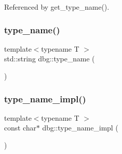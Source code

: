 Referenced by get\+\_\+type\+\_\+name().

\mbox{\label{namespacedbg_aab63fa619583229308f148088ffac7a0}} 
\subsubsection{\texorpdfstring{type\+\_\+name()}{type\_name()}}
{\footnotesize\ttfamily template$<$typename T $>$ \\
std\+::string dbg\+::type\+\_\+name (\begin{DoxyParamCaption}{ }\end{DoxyParamCaption})}

\mbox{\label{namespacedbg_aaf90b7c26aa95f1666f2446996973cac}} 
\subsubsection{\texorpdfstring{type\+\_\+name\+\_\+impl()}{type\_name\_impl()}}
{\footnotesize\ttfamily template$<$typename T $>$ \\
const char$\ast$ dbg\+::type\+\_\+name\+\_\+impl (\begin{DoxyParamCaption}{ }\end{DoxyParamCaption})}

